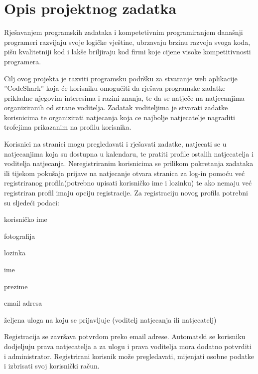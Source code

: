 \chapter{Opis projektnog zadatka}
		
	
		
		Rješavanjem programskih zadataka i kompetetivnim programiranjem današnji programeri razvijaju svoje logičke vještine, ubrzavaju brzinu razvoja svoga koda, pišu kvalitetniji kod i lakše briljiraju kod firmi koje cijene visoke kompetitivnosti programera.
		
		Cilj ovog projekta je razviti programsku podršku za stvaranje web aplikacije
		”CodeShark” koja će korisniku omogućiti da rješava programske zadatke prikladne njegovim interesima i razini znanja, te da se natječe na natjecanjima organiziranih od strane voditelja. Zadatak voditeljima je stvarati zadatke korisnicima te organizirati natjecanja koja ce najbolje natjecatelje nagraditi trofejima prikazanim na profilu korisnika.
			
		Korisnici na stranici mogu pregledavati i rješavati zadatke, natjecati se u natjecanjima koja su dostupna u kalendaru, te pratiti profile ostalih natjecatelja i voditelja natjecanja. Neregistriranim korisnicima se prilikom pokretanja zadataka ili tijekom pokušaja prijave na natjecanje otvara stranica za log-in pomoću već registriranog profila(potrebno upisati korisničko ime i lozinku) te ako nemaju već registriran profil imaju opciju registracije. Za registraciju novog profila potrebni su sljedeći podaci:
				
	
		
		\begin{packed_item}
			\item korisničko ime
			\item fotografija
			\item lozinka
			\item ime
			\item prezime
			\item email adresa
			\item željena uloga na koju se prijavljuje (voditelj natjecanja ili natjecatelj)
		\end{packed_item}
		
		Registracija se završava potvrdom preko email adrese. Automatski se korisniku dodjeljuju prava natjecatelja a za ulogu i prava voditelja mora dodatno potvrditi i administrator. Registrirani korisnik može pregledavati, mijenjati osobne podatke i izbrisati svoj korisnički račun.
		
